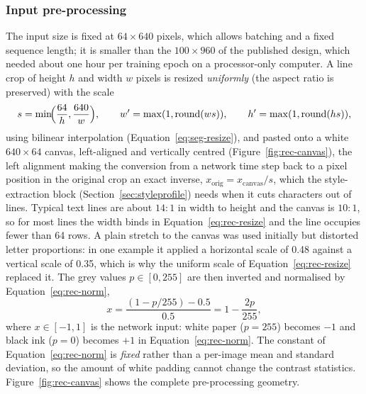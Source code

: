 \subsubsection{Input pre-processing}

The input size is fixed at $64\times640$ pixels, which allows batching and a fixed sequence length; it is smaller than the $100\times960$ of the published design, which needed about one hour per training epoch on a processor-only computer.
A line crop of height $h$ and width $w$ pixels is resized \emph{uniformly} (the aspect ratio is preserved) with the scale
\begin{equation}
s=\min\!\Bigl(\frac{64}{h},\frac{640}{w}\Bigr),\qquad w'=\max(1,\mathrm{round}(ws)),\qquad h'=\max(1,\mathrm{round}(hs)),
\label{eq:rec-resize}
\end{equation}
using bilinear interpolation (Equation~\ref{eq:seg-resize}), and pasted onto a white $640\times64$ canvas, left-aligned and vertically centred (Figure~\ref{fig:rec-canvas}), the left alignment making the conversion from a network time step back to a pixel position in the original crop an exact inverse, $x_{\mathrm{orig}}=x_{\mathrm{canvas}}/s$, which the style-extraction block (Section~\ref{sec:styleprofile}) needs when it cuts characters out of lines.
Typical text lines are about $14{:}1$ in width to height and the canvas is $10{:}1$, so for most lines the width binds in Equation~\ref{eq:rec-resize} and the line occupies fewer than 64 rows.
A plain stretch to the canvas was used initially but distorted letter proportions: in one example it applied a horizontal scale of 0.48 against a vertical scale of 0.35, which is why the uniform scale of Equation~\ref{eq:rec-resize} replaced it.
The grey values $p\in[0,255]$ are then inverted and normalised by Equation~\ref{eq:rec-norm},
\begin{equation}
x=\frac{(1-p/255)-0.5}{0.5}=1-\frac{2p}{255},
\label{eq:rec-norm}
\end{equation}
where $x\in[-1,1]$ is the network input: white paper ($p=255$) becomes $-1$ and black ink ($p=0$) becomes $+1$ in Equation~\ref{eq:rec-norm}.
The constant of Equation~\ref{eq:rec-norm} is \emph{fixed} rather than a per-image mean and standard deviation, so the amount of white padding cannot change the contrast statistics.
Figure~\ref{fig:rec-canvas} shows the complete pre-processing geometry.

